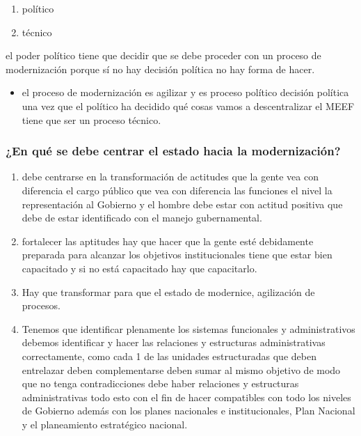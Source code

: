 \documentclass[
  a4paper,
]{article}
\providecommand{\tightlist}{%
  \setlength{\itemsep}{0pt}\setlength{\parskip}{0pt}}\usepackage{longtable,booktabs,array}
\begin{document}
\begin{enumerate}
\def\labelenumi{\arabic{enumi}.}
\tightlist
\item
  político
\item
  técnico
\end{enumerate}

el poder político tiene que decidir que se debe proceder con un proceso
de modernización porque sí no hay decisión política no hay forma de
hacer.

\begin{itemize}
\tightlist
\item
  el proceso de modernización es agilizar y es proceso político decisión
  política una vez que el político ha decidido qué cosas vamos a
  descentralizar el MEEF tiene que ser un proceso técnico.
\end{itemize}

\subsubsection{¿En qué se debe centrar el estado hacia la
modernización?}\label{en-quuxe9-se-debe-centrar-el-estado-hacia-la-modernizaciuxf3n}

\begin{enumerate}
\def\labelenumi{\arabic{enumi}.}
\tightlist
\item
  debe centrarse en la transformación de actitudes que la gente vea con
  diferencia el cargo público que vea con diferencia las funciones el
  nivel la representación al Gobierno y el hombre debe estar con actitud
  positiva que debe de estar identificado con el manejo gubernamental.
\item
  fortalecer las aptitudes hay que hacer que la gente esté debidamente
  preparada para alcanzar los objetivos institucionales tiene que estar
  bien capacitado y si no está capacitado hay que capacitarlo.
\item
  Hay que transformar para que el estado de modernice, agilización de
  procesos.
\item
  Tenemos que identificar plenamente los sistemas funcionales y
  administrativos debemos identificar y hacer las relaciones y
  estructuras administrativas correctamente, como cada 1 de las unidades
  estructuradas que deben entrelazar deben complementarse deben sumar al
  mismo objetivo de modo que no tenga contradicciones debe haber
  relaciones y estructuras administrativas todo esto con el fin de hacer
  compatibles con todo los niveles de Gobierno además con los planes
  nacionales e institucionales, Plan Nacional y el planeamiento
  estratégico nacional.
\end{enumerate}
\end{document}
